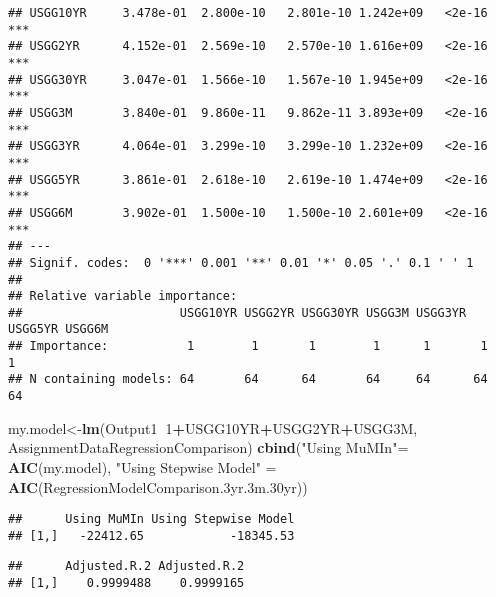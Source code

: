 \documentclass[]{article}
\newenvironment{Shaded}{\begin{snugshade}}{\end{snugshade}}
\newcommand{\KeywordTok}[1]{\textcolor[rgb]{0.13,0.29,0.53}{\textbf{#1}}}
\newcommand{\DecValTok}[1]{\textcolor[rgb]{0.00,0.00,0.81}{#1}}
\newcommand{\StringTok}[1]{\textcolor[rgb]{0.31,0.60,0.02}{#1}}
\newcommand{\OperatorTok}[1]{\textcolor[rgb]{0.81,0.36,0.00}{\textbf{#1}}}
\newcommand{\NormalTok}[1]{#1}
\begin{document}
\begin{verbatim}
## USGG10YR     3.478e-01  2.800e-10   2.801e-10 1.242e+09   <2e-16 ***
## USGG2YR      4.152e-01  2.569e-10   2.570e-10 1.616e+09   <2e-16 ***
## USGG30YR     3.047e-01  1.566e-10   1.567e-10 1.945e+09   <2e-16 ***
## USGG3M       3.840e-01  9.860e-11   9.862e-11 3.893e+09   <2e-16 ***
## USGG3YR      4.064e-01  3.299e-10   3.299e-10 1.232e+09   <2e-16 ***
## USGG5YR      3.861e-01  2.618e-10   2.619e-10 1.474e+09   <2e-16 ***
## USGG6M       3.902e-01  1.500e-10   1.500e-10 2.601e+09   <2e-16 ***
## ---
## Signif. codes:  0 '***' 0.001 '**' 0.01 '*' 0.05 '.' 0.1 ' ' 1
## 
## Relative variable importance: 
##                      USGG10YR USGG2YR USGG30YR USGG3M USGG3YR USGG5YR USGG6M
## Importance:           1        1       1        1      1       1       1    
## N containing models: 64       64      64       64     64      64      64
\end{verbatim}

\begin{Shaded}
\begin{Highlighting}[]
\NormalTok{my.model<-}\KeywordTok{lm}\NormalTok{(Output1}\OperatorTok{~}\DecValTok{1}\OperatorTok{+}\NormalTok{USGG10YR}\OperatorTok{+}\NormalTok{USGG2YR}\OperatorTok{+}\NormalTok{USGG3M, AssignmentDataRegressionComparison)}
\KeywordTok{cbind}\NormalTok{(}\StringTok{"Using MuMIn"}\NormalTok{=}\StringTok{ }\KeywordTok{AIC}\NormalTok{(my.model), }\StringTok{"Using Stepwise Model"}\NormalTok{ =}\StringTok{ }\KeywordTok{AIC}\NormalTok{(RegressionModelComparison.3yr.3m.30yr))}
\end{Highlighting}
\end{Shaded}

\begin{verbatim}
##      Using MuMIn Using Stepwise Model
## [1,]   -22412.65            -18345.53
\end{verbatim}

\begin{Shaded}
\end{Shaded}

\begin{verbatim}
##      Adjusted.R.2 Adjusted.R.2
## [1,]    0.9999488    0.9999165
\end{verbatim}
\end{document}
